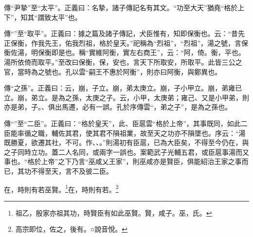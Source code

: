 {\noindent\zhuan{}\fzbyks 傳“尹摯”至“太平”。正義曰：名摯，諸子傳記名有其文。“功至大天”猶堯“格於上下”，知其“謂致太平”也。 \par}

{\noindent\zhuan{}\fzbyks 傳“”至“取平”。正義曰：據之篇及諸子傳記，犬臣惟有，知即保衡也。云：“昔先正保衡，作我先王，佑我烈祖，格於皇天。”祀稱為“烈祖”，“烈祖”，湯之號，言保衡佐湯，明保衡即是也。稱“實維阿衡，實左右商王”，云：“阿，倚。衡，平也。湯所依倚而取平。”至改曰保衡，保，安也，言天下所取安，所取平。此皆三公之官，當時為之號也。孔以雲“嗣王不惠於阿衡”，則亦曰阿衡，與鄭異也。 \par}

{\noindent\zhuan{}\fzbyks 傳“之孫”。正義曰：云，崩，子立。崩，弟太庚立。崩，子小甲立。崩，弟雍已立。崩，弟立。是為之孫，太庚之子。云，小甲，太庚弟；雍己、又是小甲弟，則亦是弟，子。、俱出馬遷，必有一誤。孔於序傳雲“，弟之子”，是為之孫也。 \par}

{\noindent\zhuan{}\fzbyks 傳“”至“二臣”。正義曰：“格於皇天”，此、臣扈雲“格於上帝”，其事既同，如此二臣能率循之職，輔佐其君，使其君不隕祖業，故至天之功亦不隕墜也。序云：“湯既勝夏，欲遷其社，不可。作、、。”則湯初有臣扈，已為大臣矣，不得至今仍在，與之子同時立功。蓋二人名同，或兩字一誤也。案範武子光輔五君，或臣扈事湯而又事也。“格於上帝”之下乃言“巫咸乂王家”，則巫咸亦是賢臣，俱能紹治王家之事而已，其功不得至天，言不及彼二臣。 \par}

在，時則有若巫賢。\footnote{祖乙，殷家亦祖其功，時賢臣有如此巫賢。賢，咸子。巫，氏。}在，時則有若。\footnote{高宗即位，佐之，後有。○說音悅。}

